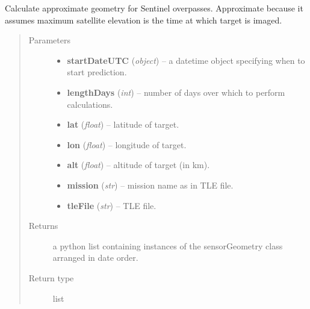 \documentclass[letterpaper,10pt,english]{sphinxmanual}
\begin{document}
\begin{fulllineitems}
\label{source/sentinel_simulator:sentinel_simulator.satelliteGeometry.getSentinel2Geometry}
Calculate approximate geometry for Sentinel overpasses.
Approximate because it assumes maximum satellite elevation
is the time at which target is imaged.
\begin{quote}\begin{description}
\item[{Parameters}] \leavevmode\begin{itemize}
\item {} 
\textbf{startDateUTC} (\emph{object}) -- a datetime object specifying when to start prediction.

\item {} 
\textbf{lengthDays} (\emph{int}) -- number of days over which to perform calculations.

\item {} 
\textbf{lat} (\emph{float}) -- latitude of target.

\item {} 
\textbf{lon} (\emph{float}) -- longitude of target.

\item {} 
\textbf{alt} (\emph{float}) -- altitude of target (in km).

\item {} 
\textbf{mission} (\emph{str}) -- mission name as in TLE file.

\item {} 
\textbf{tleFile} (\emph{str}) -- TLE file.

\end{itemize}

\item[{Returns}] \leavevmode
a python list containing instances of the sensorGeometry class arranged in date order.

\item[{Return type}] \leavevmode
list

\end{description}\end{quote}

\end{fulllineitems}

\end{document}
